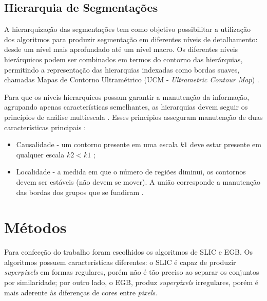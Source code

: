 \begin{document}
\subsection{Hierarquia de Segmentações} \label{ssec:hierarq_segmentacao}

A hierarquização das segmentações tem como objetivo possibilitar a utilização dos algoritmos para produzir segmentação em diferentes níveis de detalhamento: desde um nível mais aprofundado até um nível macro. Os diferentes níveis hierárquicos podem ser combinados em termos do contorno das hierárquias, permitindo a representação das hierarquias indexadas como bordas suaves, chamadas Mapas de Contorno Ultramétrico (UCM - \textit{Ultrametric Contour Map}) \cite{ULTRAMETRIC}.

Para que os níveis hierarquicos possam garantir a manutenção da informação, agrupando apenas características semelhantes, as hierarquias devem seguir os princípios de análise multiescala \cite{SILVIO_ZENILTON}. Esses princípios asseguram manutenção de duas características principais \cite{SILVIO_ZENILTON}:

\begin{itemize}
 \item Causalidade - um contorno presente em uma escala $k1$ deve estar presente em qualquer escala $k2 < k1$ \cite{SILVIO_ZENILTON};
 \item Localidade - a medida em que o número de regiões diminui, os contornos devem ser estáveis (não devem se mover). A união corresponde a manutenção das bordas dos grupos que se fundiram \cite{SILVIO_ZENILTON}.
\end{itemize}


\section{Métodos} \label{sec:mat_metodos}

Para confecção do trabalho foram escolhidos os algoritmos de SLIC e EGB. Os algoritmos possuem características diferentes: o SLIC é capaz de produzir \textit{superpixels} em formas regulares, porém não é tão preciso ao separar os conjuntos por similaridade; por outro lado, o EGB, produz \textit{superpixels} irregulares, porém é mais aderente às diferenças de cores entre \textit{pixels}.
\end{document}
